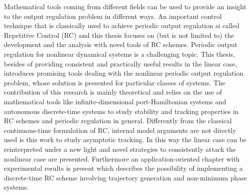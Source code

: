 \par
 Mathematical tools coming from different fields can be used
to provide an insight to the output regulation problem in different ways.
An important control technique that is classically used to achieve periodic output regulation si called Repetitive Control (RC) and this thesis focuses on (but is not
limited to) the development and the analysis with novel tools of RC schemes.
Periodic output regulation for nonlinear dynamical systems is a challenging topic.
This thesis, besides of providing consistent and practically useful results in the linear
case, introduces promising tools dealing with the nonlinear periodic output regulation problem, whose solution is presented for particular classes of systems.
The contribution of this research is mainly theoretical and relies on the use of
mathematical tools like infinite-dimensional port-Hamiltonian systems and autonomous
discrete-time systems to study stability and tracking properties in RC schemes and periodic regulation in general. Differently from the classical continuous-time formulation of RC, internal model arguments are not directly used is this work to study
asymptotic tracking. In this way the linear case can be reinterpreted under a new
light and novel strategies to consistently attack the nonlinear case are presented.
Furthermore an application-oriented chapter with experimental results is present
which describes the possibility of implementing a discrete-time RC scheme involving trajectory generation and non-minimum phase systems.
%
